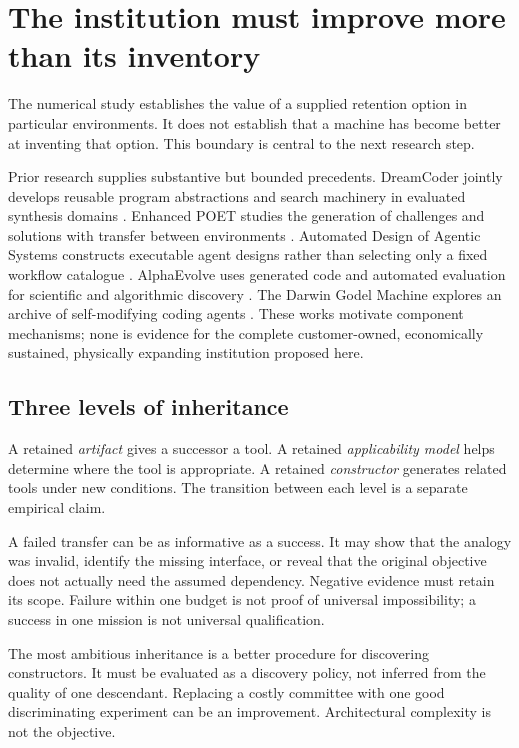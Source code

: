 \section{The institution must improve more than its inventory}
\label{sec:discovery}
The numerical study establishes the value of a supplied retention option in particular environments. It does not establish that a machine has become better at inventing that option. This boundary is central to the next research step.

Prior research supplies substantive but bounded precedents. DreamCoder jointly develops reusable program abstractions and search machinery in evaluated synthesis domains \citep{dreamcoder}. Enhanced POET studies the generation of challenges and solutions with transfer between environments \citep{poet}. Automated Design of Agentic Systems constructs executable agent designs rather than selecting only a fixed workflow catalogue \citep{adas}. AlphaEvolve uses generated code and automated evaluation for scientific and algorithmic discovery \citep{alphaevolve}. The Darwin Godel Machine explores an archive of self-modifying coding agents \citep{dgm}. These works motivate component mechanisms; none is evidence for the complete customer-owned, economically sustained, physically expanding institution proposed here.

\subsection{Three levels of inheritance}
A retained \emph{artifact} gives a successor a tool. A retained \emph{applicability model} helps determine where the tool is appropriate. A retained \emph{constructor} generates related tools under new conditions. The transition between each level is a separate empirical claim.

A failed transfer can be as informative as a success. It may show that the analogy was invalid, identify the missing interface, or reveal that the original objective does not actually need the assumed dependency. Negative evidence must retain its scope. Failure within one budget is not proof of universal impossibility; a success in one mission is not universal qualification.

The most ambitious inheritance is a better procedure for discovering constructors. It must be evaluated as a discovery policy, not inferred from the quality of one descendant. Replacing a costly committee with one good discriminating experiment can be an improvement. Architectural complexity is not the objective.

